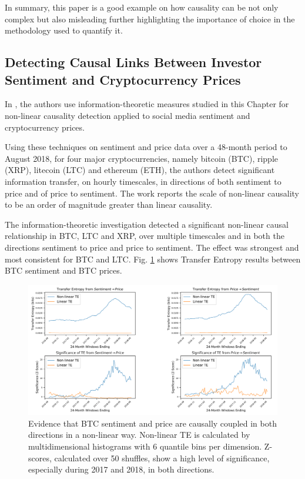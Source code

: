 \documentclass[]{book}
\theoremstyle{definition}
\theoremstyle{definition}
\theoremstyle{definition}
\theoremstyle{remark}
\begin{document}
In summary, this paper \citep{2016arXiv160104535S} is a good example on
how causality can be not only complex but also misleading further
highlighting the importance of choice in the methodology used to
quantify it.

\subsection{Detecting Causal Links Between Investor Sentiment and
Cryptocurrency
Prices}\label{detecting-causal-links-between-investor-sentiment-and-cryptocurrency-prices}

In \citep{keskin2019information}, the authors use information-theoretic
measures studied in this Chapter for non-linear causality detection
applied to social media sentiment and cryptocurrency prices.

Using these techniques on sentiment and price data over a 48-month
period to August 2018, for four major cryptocurrencies, namely bitcoin
(BTC), ripple (XRP), litecoin (LTC) and ethereum (ETH), the authors
detect significant information transfer, on hourly timescales, in
directions of both sentiment to price and of price to sentiment. The
work reports the scale of non-linear causality to be an order of
magnitude greater than linear causality.

The information-theoretic investigation detected a significant
non-linear causal relationship in BTC, LTC and XRP, over multiple
timescales and in both the directions sentiment to price and price to
sentiment. The effect was strongest and most consistent for BTC and LTC.
Fig. \ref{fig:te-crypto} shows Transfer Entropy results between BTC
sentiment and BTC prices.

\begin{figure}[H]

{\centering \includegraphics[width=1\linewidth]{./chapters/TransferEntropy/te-crypto} 

}

\caption{Evidence that BTC sentiment and price are causally coupled in both directions in a non-linear way. Non-linear TE is calculated by multidimensional histograms with 6 quantile bins per dimension. Z-scores, calculated over 50 shuffles, show a high level of significance, especially during 2017 and 2018, in both directions.}\label{fig:te-crypto}
\end{figure}
\end{document}
